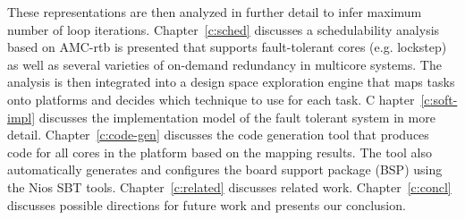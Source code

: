 	These representations are then analyzed in further detail to infer maximum number of loop iterations. 
	Chapter~\ref{c:sched} discusses a schedulability analysis based on AMC-rtb is presented that supports fault-tolerant cores (e.g. lockstep) as well as several varieties of on-demand redundancy in multicore systems. 
	The analysis is then integrated into a design space exploration engine that maps tasks onto platforms and decides which technique to use for each task. C
	hapter~\ref{c:soft-impl} discusses the implementation model of the fault tolerant system in more detail. 
	Chapter~\ref{c:code-gen} discusses the code generation tool that produces code for all cores in the platform based on the mapping results. 
	The tool also automatically generates and configures the board support package (BSP) using the Nios SBT tools. 
	Chapter~\ref{c:related} discusses related work. 
	Chapter~\ref{c:concl} discusses possible directions for future work and presents our conclusion.
